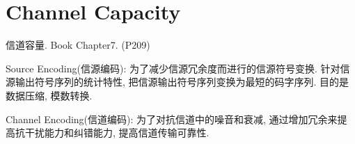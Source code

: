 \chapter{Channel Capacity}

信道容量. \qquad Book Chapter7. (P209)

Source Encoding(信源编码): 为了减少信源冗余度而进行的信源符号变换. 针对信源输出符号序列的统计特性, 把信源输出符号序列变换为最短的码字序列. 目的是数据压缩, 模数转换.

Channel Encoding(信道编码): 为了对抗信道中的噪音和衰减, 通过增加冗余来提高抗干扰能力和纠错能力, 提高信道传输可靠性.





